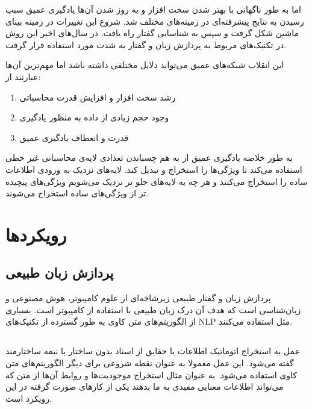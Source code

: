 \documentclass[12pt, a4paper, oneside]{report}
\begin{document}
اما به طور ناگهانی با بهتر شدن سخت افزار و به روز شدن آن‌ها یادگیری عمیق سبب رسیدن به نتایج پیشرفته‌ای در زمینه‌های مختلف شد.
شروع این تغییرات در زمینه بینای ماشین شکل گرفت و سپس به شناسایی گفتار راه یافت. در سال‌های اخیر این روش در تکنیک‌های
مربوط به پردازش زبان و گفتار به شدت مورد استفاده قرار گرفت.

این انقلاب شبکه‌های عمیق می‌تواند دلایل مختلفی داشته باشد اما مهم‌ترین آن‌ها عبارتند از:

\begin{enumerate}
	\item رشد سخت افزار و افزایش قدرت محاسباتی
	\item وجود حجم زیادی از داده به منظور یادگیری
	\item قدرت و انعطاف یادگیری عمیق
\end{enumerate}

به طور خلاصه یادگیری عمیق از به هم چسباندن تعدادی لایه‌ی محاسباتی غیر خطی استفاده می‌کند تا ویژگی‌ها را استخراج و تبدیل کند.
لایه‌های نزدیک به ورودی اطلاعات ساده را استخراج می‌کنند و هر چه به لایه‌های جلو تر نزدیک می‌شویم ویژگی‌های پیچیده تر
از ویژگی‌های ساده استخراج می‌شوند.

\section{رویکردها}

\subsection{پردازش زبان طبیعی}

پردازش زبان و گفتار طبیعی زیرشاخه‌ای از علوم کامپیوتر، هوش مصنوعی و زبان‌شناسی است که هدف آن درک زبان طبیعی با
استفاده از کامپیوتر است. بسیاری از الگوریتم‌های متن کاوی به طور گسترده از تکنیک‌های
NLP
مثل
استفاده می‌کنند\cite{DBLP:journals/corr/AllahyariPASTGK17a}.

\subsection{}

عمل 
به استخراج اتوماتیک اطلاعات یا حقایق از اسناد بدون ساختار یا نیمه ساختارمند گفته می‌شود.
این عمل معمولا به عنوان نقطه شروعی برای دیگر الگوریتم‌های متن کاوی استفاده می‌شود. به عنوان مثال استخراج
موجودیت‌ها و روابط آن‌ها از متن که می‌تواند اطلاعات معنایی مفیدی به ما بدهند یکی از کار‌های صورت گرفته
در این رویکرد است\cite{DBLP:journals/corr/AllahyariPASTGK17a}.
\end{document}
